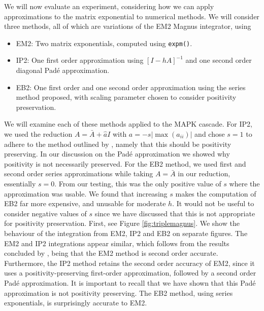 We will now evaluate an experiment, considering how we can apply approximations to the matrix exponential to numerical methods.
We will consider three methods, all of which are variations of the EM2 Magnus integrator, using
\begin{itemize}
    \item EM2: Two matrix exponentials, computed using \texttt{expm()}.
    \item IP2: One first order approximation using $[I-hA]^{-1}$ and one second order diagonal Pad\'e approximation.
    \item EB2: One first order and one second order approximation using the series method proposed, with scaling parameter chosen to consider positivity preservation. 
\end{itemize}
We will examine each of these methods applied to the MAPK cascade.
For IP2, we used the reduction $A = \bar{A} + \hat{a}I$ with $a = -s |\max(a_{ii})|$ and chose $s=1$ to adhere to the method outlined by \cite{blanes_pos_2022},
namely that this should be positivity preserving. In our discussion on the Pad\'e approximation we showed why positivity is not necessarily preserved.
For the EB2 method, we used first and second order series approximations while taking $A = \bar{A}$ in our reduction, essentially $s=0$.
From our testing, this was the only positive value of $s$ where the approximation was usable.
We found that increasing $s$ makes the computation of EB2 far more expensive, and unusable for moderate $h$.
It would not be useful to consider negative values of $s$ since we have discussed that this is not appropriate for positivity preservation.
First, see Figure \ref{fig:triplemagnus}. We show the behaviour of the integration from EM2, IP2 and EB2 on separate figures.
The EM2 and IP2 integrations appear similar, which follows from the results concluded by \cite{blanes_pos_2022},
being that the EM2 method is second order accurate.
Furthermore, the IP2 method retains the second order accuracy of EM2, since it uses a positivity-preserving first-order approximation, followed by a second order Pad\'e approximation. 
It is important to recall that we have shown that this Pad\'e approximation is not positivity preserving.
The EB2 method, using series exponentials, is surprisingly accurate to EM2.

